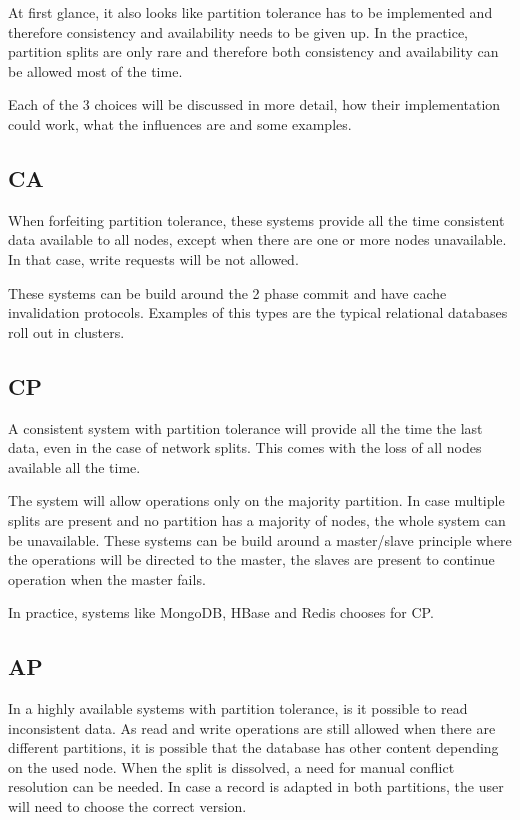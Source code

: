 \documentclass[final,5p,times]{elsarticle}
\begin{document}
At first glance, it also looks like partition tolerance has to be implemented and therefore consistency and availability needs to be given up. In the practice, partition splits are only rare and therefore both consistency and availability can be allowed most of the time. 

Each of the 3 choices will be discussed in more detail, how their implementation could work, what the influences are and some examples. 

\subsection{CA}
When forfeiting partition tolerance, these systems provide all the time consistent data available to all nodes, except when there are one or more nodes unavailable. In that case, write requests will be not allowed. 

These systems can be build around the 2 phase commit and have cache invalidation protocols. Examples of this types are the typical relational databases roll out in clusters. 

\subsection{CP}
A consistent system with partition tolerance will provide all the time the last data, even in the case of network splits. This comes with the loss of all nodes available all the time. 

The system will allow operations only on the majority partition. In case multiple splits are present and no partition has a majority of nodes, the whole system can be unavailable. These systems can be build around a master/slave principle where the operations will be directed to the master, the slaves are present to continue operation when the master fails.

In practice, systems like MongoDB, HBase and Redis chooses for CP. 

\subsection{AP}
In a highly available systems with partition tolerance, is it possible to read inconsistent data. As read and write operations are still allowed when there are different partitions, it is possible that the database has other content depending on the used node. When the split is dissolved, a need for manual conflict resolution can be needed. In case a record is adapted in both partitions, the user will need to choose the correct version. 
\end{document}
